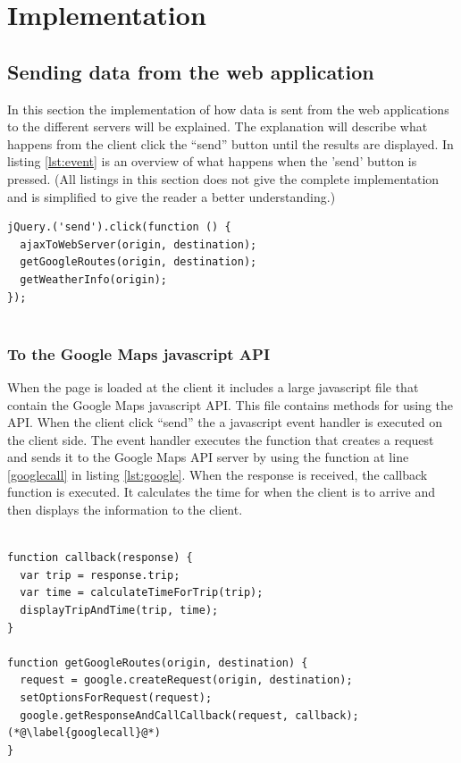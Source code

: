 \documentclass[10pt,a4paper]{article}
\begin{document}
\section{Implementation}

\subsection{Sending data from the web application}
\label{sec:sending-data-from}
In this section the implementation of how data is sent from the web applications to the different servers will be explained. The explanation will describe what happens from the client click the ``send'' button until the results are displayed. In listing \ref{lst:event} is an overview of what happens when the 'send' button is pressed. (All listings in this section does not give the complete implementation and is simplified to give the reader a better understanding.)

\begin{lstlisting}[caption=Event handler, label=lst:event]
jQuery.('send').click(function () {
  ajaxToWebServer(origin, destination);
  getGoogleRoutes(origin, destination);
  getWeatherInfo(origin);
});
  
\end{lstlisting}
\subsubsection{To the Google Maps javascript API}
\label{sec:google-maps-javascr}
When the page is loaded at the client it includes a large javascript file that contain the Google Maps javascript API. This file contains methods for using the API.
When the client click ``send'' the a javascript event handler is executed on the client side. The event handler executes the function that creates a request and sends it to the Google Maps API server by using the function at line \ref{googlecall} in listing \ref{lst:google}. When the response is received, the callback function is  executed. It calculates the time for when the client is to arrive and then displays the information to the client.

\begin{lstlisting}[caption=Using the Google Maps javascript API, label=lst:google]

function callback(response) {
  var trip = response.trip;
  var time = calculateTimeForTrip(trip);
  displayTripAndTime(trip, time);
}

function getGoogleRoutes(origin, destination) {
  request = google.createRequest(origin, destination);
  setOptionsForRequest(request);
  google.getResponseAndCallCallback(request, callback); (*@\label{googlecall}@*)
}
  
\end{lstlisting}
\end{document}
